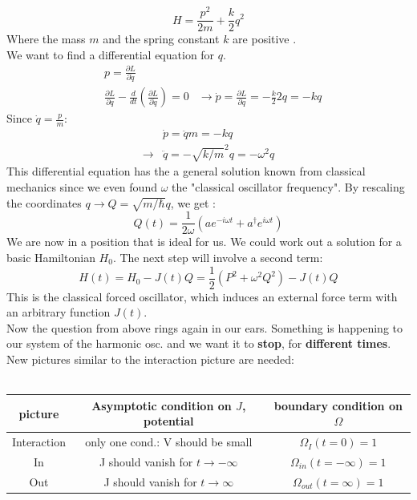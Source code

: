 \documentclass[12pt, titlepage]{article}
\begin{document}
 \begin{equation}\label{eq:Hamil_harm_osz}
 H=\frac{p^{2}}{2m}+\frac{k}{2}q^{2}
 \end{equation}
Where the mass $ m $ and the spring constant $ k $ are positive .\\ 
We want to find a differential equation for $ q $.
\begin{align*}
&p=\frac{\partial L}{\partial \dot{q}}\\
&\frac{\partial L}{\partial q}-\frac{d}{dt}(\frac{\partial L}{\partial \dot{q}})=0
&\rightarrow \dot{p}=\frac{\partial L}{\partial q}=-\frac{k}{2}2q=-kq
\end{align*}
Since $ \dot{q} =\frac{p}{m} $:
\begin{align*}
&\dot{p}=\ddot{q}m=-kq\\
\rightarrow &\ddot{q}=-\sqrt{k/m}^{2}q=-\omega ^{2}q
\end{align*}
This differential equation has the a general solution known from classical mechanics since we even found $ \omega $ the "classical oscillator frequency". By rescaling the coordinates $ q\rightarrow Q=\sqrt{m/\hbar}q $, we get :\\
\begin{equation}
	Q(t)=\frac{1}{2\omega}(ae^{-i\omega t}+a^{\dagger}e^{i\omega t})
\end{equation}
We are now in a position that is ideal for us. We could work out  a solution for a basic Hamiltonian $ H_0 $. The next step will involve a second term:
\begin{equation}
H(t)=H_0 -J(t)Q=\frac{1}{2}(P^{2}+\omega^{2}Q^{2})-J(t)Q
\end{equation}
This is the classical forced oscillator, which induces an external force term with an arbitrary function $ J(t) $.\\
Now the question from above rings again in our ears. Something is happening to our system of the harmonic osc. and we want it to\textbf{ stop}, for \textbf{different times}. New pictures similar to the interaction picture are needed:\\\\
\begin{tabular}{|c|c|c|}\hline
   picture & Asymptotic condition on $ J $, potential & boundary condition on $ \Omega $\\ \hline
   Interaction & only one cond.: V should be small & $ \Omega _{I}(t=0)=1 $ \\ \hline
   In & J should vanish for $ t \rightarrow -\infty $ & $ \Omega _{in}(t=-\infty)=1 $ \\ \hline
   Out & J should vanish for $ t \rightarrow \infty $ & $ \Omega _{out}(t=\infty)=1 $ \\ \hline
 \end{tabular}
\end{document}
